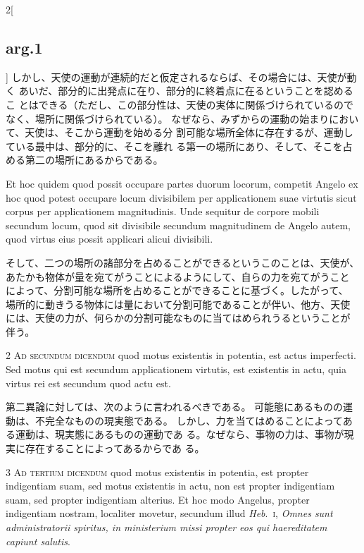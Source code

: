 \documentclass[paper=a4paper,fontsize=10pt,jafontsize=9pt,titlepage]{jlreq}
\begin{document}
\begin{paracol}{2}[\subsection{arg.1}]
しかし、天使の運動が連続的だと仮定されるならば、その場合には、天使が動く
 あいだ、部分的に出発点に在り、部分的に終着点に在るということを認めるこ
 とはできる（ただし、この部分性は、天使の実体に関係づけられているので
 なく、場所に関係づけられている）。
なぜなら、みずからの運動の始まりにおいて、天使は、そこから運動を始める分
 割可能な場所全体に存在するが、運動している最中は、部分的に、そこを離れ
 る第一の場所にあり、そして、そこを占める第二の場所にあるからである。

\switchcolumn*

Et
hoc quidem quod possit occupare partes duorum locorum, competit Angelo
ex hoc quod potest occupare locum divisibilem per applicationem suae
virtutis sicut corpus per applicationem magnitudinis. Unde sequitur de
corpore mobili secundum locum, quod sit divisibile secundum magnitudinem
de Angelo autem, quod virtus eius possit applicari alicui divisibili.

\switchcolumn

そして、二つの場所の諸部分を占めることができるというこのことは、天使が、
 あたかも物体が量を宛てがうことによるようにして、自らの力を宛てがうこと
 によって、分割可能な場所を占めることができることに基づく。したがって、
 場所的に動きうる物体には量において分割可能であることが伴い、他方、天使
 には、天使の力が、何らかの分割可能なものに当てはめられうるということが
 伴う。

\switchcolumn*[\subsection{ad.2}]

2 {\scshape Ad secundum dicendum} quod motus existentis in
potentia, est actus imperfecti. Sed motus qui est secundum applicationem
virtutis, est existentis in actu, quia virtus rei est secundum quod actu
est.

\switchcolumn

第二異論に対しては、次のように言われるべきである。
可能態にあるものの運動は、不完全なものの現実態である。
しかし、力を当てはめることによってある運動は、現実態にあるものの運動であ
 る。なぜなら、事物の力は、事物が現実に存在することによってあるからであ
 る。

\switchcolumn*[\subsection{ad.3}]

3 {\scshape Ad tertium dicendum} quod motus existentis in potentia, est
propter indigentiam suam, sed motus existentis in actu, non est propter
indigentiam suam, sed propter indigentiam alterius. Et hoc modo Angelus,
propter indigentiam nostram, localiter movetur, secundum illud {\itshape
Heb}.~{\scshape i}, {\itshape Omnes sunt administratorii spiritus, in
ministerium missi propter eos qui haereditatem capiunt salutis}.


\end{paracol}
\end{document}

